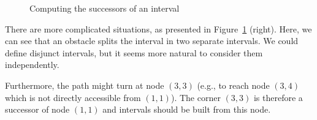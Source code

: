 \begin{figure}[ht]
  \begin{minipage}{0.5\linewidth}
  \begin{center}
    
  \end{center}
  \end{minipage}
  \begin{minipage}{0.5\linewidth}
  \begin{center}
    
  \end{center}
  \end{minipage}
  \caption{Computing the successors of an interval}
  \label{fig::succ1}
\end{figure}

There are more complicated situations, 
as presented in Figure~\ref{fig::succ1} (right).  
Here, we can see that an obstacle splits the interval 
in two separate intervals.  
We could define disjunct intervals, 
but it seems more natural to consider them independently.  

Furthermore, the path might turn at node $(3,3)$
(e.g., to reach node $(3,4)$
which is not directly accessible from $(1,1)$).  
The corner $(3,3)$ is therefore a successor of node $(1,1)$ 
and intervals should be built from this node.  


